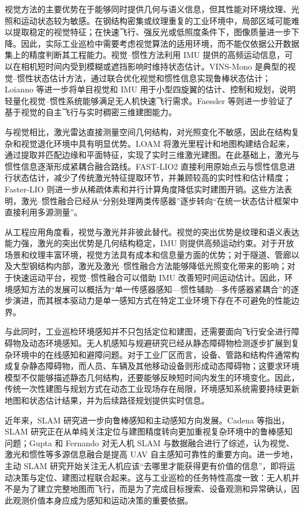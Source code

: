 视觉方法的主要优势在于能够同时提供几何与语义信息，但其性能对环境纹理、光照和运动状态较为敏感。在钢结构密集或纹理重复的工业环境中，局部区域可能难以提取稳定的视觉特征；在快速飞行、强反光或低照度条件下，图像质量进一步下降。因此，实际工业巡检中需要考虑视觉算法的适用环境，而不能仅依据公开数据集上的精度判断其工程能力\cite{scaramuzza2014vision,kanellakis2017survey}。视觉--惯性方法利用 IMU 提供的高频运动信息，可以在相机短时间内受到模糊或遮挡影响时维持状态估计。VINS-Mono 是典型的视觉--惯性状态估计方法，通过联合优化视觉和惯性信息实现鲁棒状态估计\cite{qin2018vins}；Loianno 等进一步将单目视觉和 IMU 用于小型四旋翼的估计、控制和规划，说明轻量化视觉--惯性系统能够满足无人机快速飞行需求\cite{loianno2017estimation}。Faessler 等则进一步验证了基于视觉的自主飞行与实时稠密三维建图能力\cite{faessler2016autonomous}。

与视觉相比，激光雷达直接测量空间几何结构，对光照变化不敏感，因此在结构复杂和视觉退化环境中具有明显优势。LOAM 将激光里程计和地图构建结合起来，通过提取并匹配边缘和平面特征，实现了实时三维激光建图\cite{zhang2014loam}。在此基础上，激光与惯性信息逐渐形成紧耦合融合路线。FAST-LIO2 直接利用原始点云与惯性信息进行状态估计，减少了传统激光特征提取环节，并兼顾较高的实时性和估计精度\cite{xu2022fast}；Faster-LIO 则进一步从稀疏体素和并行计算角度降低实时建图开销\cite{bai2022fasterlio}。这些方法表明，激光--惯性融合已经从“分别处理两类传感器”逐步转向“在统一状态估计框架中直接利用多源测量”。

从工程应用角度看，视觉与激光并非彼此替代。视觉的突出优势是纹理和语义表达能力强，激光的突出优势是几何结构稳定，IMU 则提供高频运动约束。对于开放场景和纹理丰富环境，视觉方法具有成本和信息量方面的优势；对于隧道、管廊以及大型钢结构内部，激光及激光--惯性融合方法能够降低光照变化带来的影响；对于快速运动平台，视觉--惯性融合可以借助 IMU 改善短时间运动估计\cite{qin2018vins,xu2022fast,gupta2022slam}。因此，环境感知方法的发展可以概括为“单一传感器感知—惯性辅助—多传感器紧耦合”的逐步演进，而其根本驱动力是单一感知方式在特定工业环境下存在不可避免的性能边界。

与此同时，工业巡检环境感知并不只包括定位和建图，还需要面向飞行安全进行障碍物及动态环境感知。无人机感知与规避研究已经从静态障碍物检测逐步扩展到复杂环境中的在线感知和避障问题\cite{lvyang2019sense}。对于工业厂区而言，设备、管路和结构件通常构成复杂静态障碍物，而人员、车辆及其他移动设备则形成动态障碍物；这要求环境模型不仅能够描述静态几何结构，还要能够反映短时间内发生的环境变化。因此，传统一次性建图与规划方式在动态工业现场存在局限，环境感知系统需要持续更新地图和状态估计结果，并为后续路径规划提供实时信息。

近年来，SLAM 研究进一步向鲁棒感知和主动感知方向发展。Cadena 等指出，SLAM 研究正在从单纯关注定位与建图精度转向更加重视复杂环境中的鲁棒感知问题\cite{cadena2016past}；Gupta 和 Fernando 对无人机 SLAM 与数据融合进行了综述，认为视觉、激光和惯性等多源信息融合是提高 UAV 自主感知可靠性的重要方向\cite{gupta2022slam}。进一步地，主动 SLAM 研究开始关注无人机应该“去哪里才能获得更有价值的信息”，即将运动决策与定位、建图过程联合起来\cite{placed2023active,bircher2016receding}。这与工业巡检的任务特性高度一致：无人机并不是为了建立完整地图而飞行，而是为了完成目标搜索、设备观测和异常确认，因此观测价值本身应成为感知和运动决策的重要依据。

